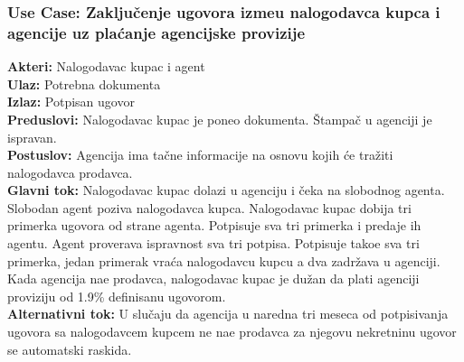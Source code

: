 \documentclass{article}
\begin{document}
\subsubsection{\bfseries Use Case: Zaklju\v {c}enje ugovora izme\dj u nalogodavca kupca i agencije uz pla\' canje agencijske provizije}
{\bfseries Akteri:} Nalogodavac kupac i agent\\
{\bfseries Ulaz:} Potrebna dokumenta\\
{\bfseries Izlaz:} Potpisan ugovor\\
{\bfseries Preduslovi:} Nalogodavac kupac je poneo dokumenta. \v {S}tampa\v {c} u agenciji je ispravan. \\
{\bfseries Postuslov:} Agencija ima ta\v {c}ne informacije na osnovu kojih \' ce tra\v {z}iti nalogodavca prodavca. \\
{\bfseries Glavni tok:} Nalogodavac kupac dolazi u agenciju i \v {c}eka na slobodnog agenta. Slobodan agent poziva nalogodavca kupca. Nalogodavac kupac dobija tri primerka ugovora od strane agenta. Potpisuje sva tri primerka i predaje ih agentu. Agent proverava ispravnost sva tri potpisa. Potpisuje tako\dj e sva tri primerka, jedan primerak vra\' ca nalogodavcu kupcu a dva zadr\v {z}ava u agenciji. Kada agencija na\dj e prodavca, nalogodavac kupac je du\v {z}an da plati agenciji proviziju od 1.9\% definisanu ugovorom. \\
{\bfseries Alternativni tok:} U slu\v {c}aju da agencija u naredna tri meseca od potpisivanja ugovora sa nalogodavcem kupcem ne na\dj e prodavca za njegovu nekretninu ugovor se automatski raskida. \\
\end{document}
